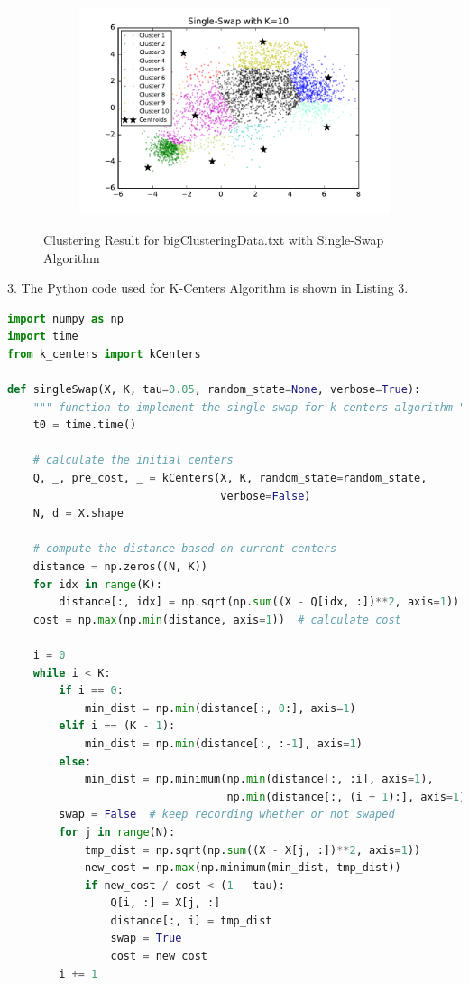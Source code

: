 \begin{description}
\begin{description}
\begin{figure}[!h]
\begin{subfigure}[b]{0.475\textwidth}
            \includegraphics[width=\textwidth]{./figures/bigClustering_singleSwap_10.pdf}
        \end{subfigure}
        
        \caption{Clustering Result for bigClusteringData.txt with Single-Swap Algorithm}
        \label{fig:single-swap-bigClustering}
\end{figure}

\newpage
\item{3.} The Python code used for K-Centers Algorithm is shown in Listing 3.

\begin{lstlisting}[language=Python, caption=Single-Swap Algorithm Python Code]
import numpy as np
import time
from k_centers import kCenters

def singleSwap(X, K, tau=0.05, random_state=None, verbose=True):
    """ function to implement the single-swap for k-centers algorithm """
    t0 = time.time()

    # calculate the initial centers
    Q, _, pre_cost, _ = kCenters(X, K, random_state=random_state,
                                 verbose=False)
    N, d = X.shape

    # compute the distance based on current centers
    distance = np.zeros((N, K))
    for idx in range(K):
        distance[:, idx] = np.sqrt(np.sum((X - Q[idx, :])**2, axis=1))
    cost = np.max(np.min(distance, axis=1))  # calculate cost

    i = 0
    while i < K:
        if i == 0:
            min_dist = np.min(distance[:, 0:], axis=1)
        elif i == (K - 1):
            min_dist = np.min(distance[:, :-1], axis=1)
        else:
            min_dist = np.minimum(np.min(distance[:, :i], axis=1),
                                  np.min(distance[:, (i + 1):], axis=1))
        swap = False  # keep recording whether or not swaped
        for j in range(N):
            tmp_dist = np.sqrt(np.sum((X - X[j, :])**2, axis=1))
            new_cost = np.max(np.minimum(min_dist, tmp_dist))
            if new_cost / cost < (1 - tau):
                Q[i, :] = X[j, :]
                distance[:, i] = tmp_dist
                swap = True
                cost = new_cost
        i += 1


\end{lstlisting}
\end{description}
\end{description}
